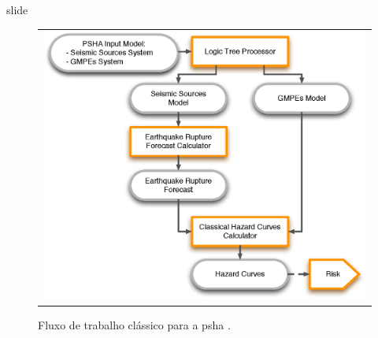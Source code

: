 \documentclass[ucs,8pt]{beamer}
\begin{document}
\begin{frame}{slide}

\begin{figure}[H]
	\centering
	\begin{tabular}{l}
	\includegraphics[height=0.80\textheight]{classical_psha_workflow}
	\end{tabular}
	\caption{Fluxo de trabalho clássico para a \gls{psha} \citep{crowley_2013}.}
\label{fig:classical_psha}
\end{figure}


\end{frame}
\end{document}
